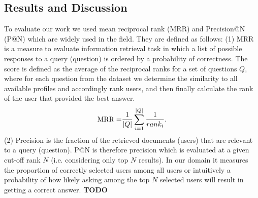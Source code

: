 \documentclass[conference]{IEEEtran}
\newcommand{\TODO}[0]{{\color{BrickRed}\textbf{TODO}}}
\begin{document}
\subsection{Results and Discussion}
To evaluate our work we used mean reciprocal rank (MRR) and Precision@N (P@N) which are widely used in the field. They are defined as follows: (1) MRR is a measure to evaluate information retrieval task in which a list of possible responses to a query (question) is ordered by a probability of correctness. The score is defined as the average of the reciprocal ranks for a set of questions $Q$, where for each question from the dataset we determine the similarity to all available profiles and accordingly rank users, and then finally calculate the rank of the user that provided the best answer.
\begin{equation}
	{\rm MRR = }\frac{1}{|Q|}\sum_{i=1}^{|Q|}\frac{1}{rank_i}.
\end{equation}
(2) Precision is the fraction of the retrieved documents (users) that are relevant to a query (question). P@N is therefore precision which is evaluated at a given cut-off rank $N$ (i.e. considering only top $N$ results). In our domain it measures the proportion of correctly selected users among all users or intuitively a probability of how likely asking among the top $N$ selected users will result in getting a correct answer.
\TODO
\end{document}

